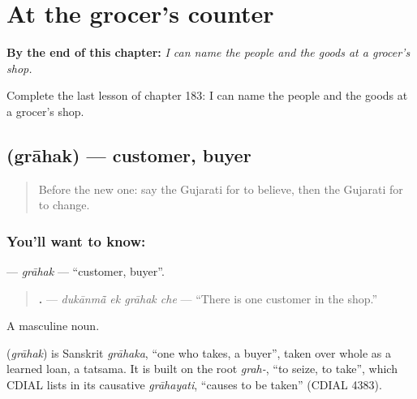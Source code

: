 
\chapter{At the grocer's counter}
\label{ch:gu-at-the-grocer-s-counter}

\begin{chapteropening}
\textbf{By the end of this chapter:} \emph{I can name the people and the goods at a grocer's shop.}

Complete the last lesson of chapter 183: I can name the people and the goods at a grocer's shop.
\end{chapteropening}

\section[\texorpdfstring{\gu{ગ્રાહક} (grāhak)}{ગ્રાહક (grāhak)}]{ (grāhak) — customer, buyer}

\label{lesson:GU-C183-grahak}



\begin{quote}
Before the new one: say the Gujarati for to believe, then the Gujarati for to change.
\end{quote}

\subsection*{You'll want to know: }
\textbf{} — \emph{grāhak} — \textquotedblleft{}customer, buyer\textquotedblright{}.

\begin{quote}
\textbf{   .} — \emph{dukānmā̃ ek grāhak che} — \textquotedblleft{}There is one customer in the shop.\textquotedblright{}
\end{quote}

A masculine noun.

\begin{cousinweb}
\textbf{} (\emph{grāhak}) is Sanskrit \emph{grāhaka}, \textquotedblleft{}one who takes, a buyer\textquotedblright{}, taken over whole as a learned loan, a tatsama. It is built on the root \emph{grah-}, \textquotedblleft{}to seize, to take\textquotedblright{}, which CDIAL lists in its causative \emph{grāhayati}, \textquotedblleft{}causes to be taken\textquotedblright{} (CDIAL 4383).
\end{cousinweb}

